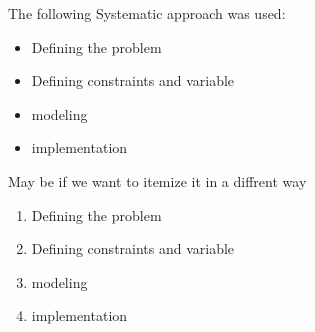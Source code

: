 The following Systematic approach was used:

\begin{itemize}
\item Defining the problem
\item Defining constraints and variable
\item modeling
\item implementation
\end{itemize}

May be if we want to itemize it in a diffrent way

\begin{enumerate}
\item Defining the problem
\item Defining constraints and variable
\item modeling
\item implementation
\end{enumerate}
